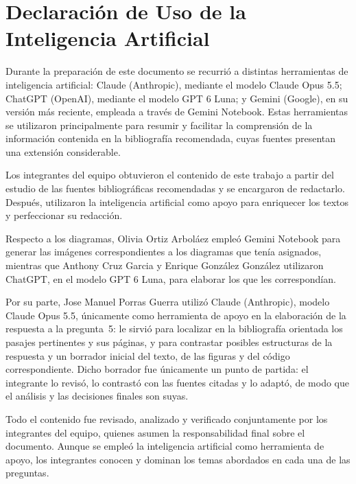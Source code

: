\section*{Declaración de Uso de la Inteligencia Artificial}

Durante la preparación de este documento se recurrió a distintas herramientas de inteligencia
artificial: Claude (Anthropic), mediante el modelo Claude Opus 5.5; ChatGPT (OpenAI), mediante
el modelo GPT 6 Luna; y Gemini (Google), en su versión más reciente, empleada a través de
Gemini Notebook. Estas herramientas se utilizaron principalmente para resumir y facilitar la
comprensión de la información contenida en la bibliografía recomendada, cuyas fuentes presentan
una extensión considerable.

Los integrantes del equipo obtuvieron el contenido de este trabajo a partir del estudio de las
fuentes bibliográficas recomendadas y se encargaron de redactarlo. Después, utilizaron la
inteligencia artificial como apoyo para enriquecer los textos y perfeccionar su redacción.

Respecto a los diagramas, Olivia Ortiz Arboláez empleó Gemini Notebook para generar las
imágenes correspondientes a los diagramas que tenía asignados, mientras que Anthony Cruz
Garcia y Enrique González González utilizaron ChatGPT, en el modelo GPT 6 Luna, para elaborar
los que les correspondían.

Por su parte, Jose Manuel Porras Guerra utilizó Claude (Anthropic), modelo Claude Opus 5.5,
únicamente como herramienta de apoyo en la elaboración de la respuesta a la pregunta~5: le sirvió
para localizar en la bibliografía orientada los pasajes pertinentes y sus páginas, y para contrastar
posibles estructuras de la respuesta y un borrador inicial del texto, de las figuras y del código
correspondiente. Dicho borrador fue únicamente un punto de partida: el integrante lo revisó, lo
contrastó con las fuentes citadas y lo adaptó, de modo que el análisis y las decisiones finales
son suyas.

Todo el contenido fue revisado, analizado y verificado conjuntamente por los integrantes del
equipo, quienes asumen la responsabilidad final sobre el documento. Aunque se empleó la
inteligencia artificial como herramienta de apoyo, los integrantes conocen y dominan los temas
abordados en cada una de las preguntas.
